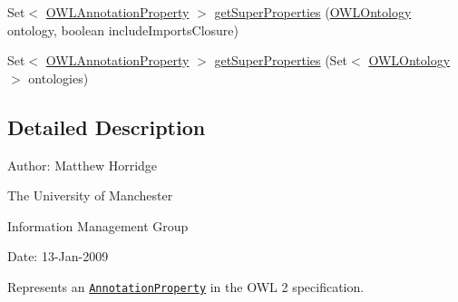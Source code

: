 \begin{DoxyCompactItemize}
\item 
Set$<$ \hyperlink{interfaceorg_1_1semanticweb_1_1owlapi_1_1model_1_1_o_w_l_annotation_property}{O\-W\-L\-Annotation\-Property} $>$ \hyperlink{interfaceorg_1_1semanticweb_1_1owlapi_1_1model_1_1_o_w_l_annotation_property_a8d84d70da5bd9e5cab3e8bb26069e190}{get\-Super\-Properties} (\hyperlink{interfaceorg_1_1semanticweb_1_1owlapi_1_1model_1_1_o_w_l_ontology}{O\-W\-L\-Ontology} ontology, boolean include\-Imports\-Closure)
\item 
Set$<$ \hyperlink{interfaceorg_1_1semanticweb_1_1owlapi_1_1model_1_1_o_w_l_annotation_property}{O\-W\-L\-Annotation\-Property} $>$ \hyperlink{interfaceorg_1_1semanticweb_1_1owlapi_1_1model_1_1_o_w_l_annotation_property_aaee41eac3141111316306ac3488bc05b}{get\-Super\-Properties} (Set$<$ \hyperlink{interfaceorg_1_1semanticweb_1_1owlapi_1_1model_1_1_o_w_l_ontology}{O\-W\-L\-Ontology} $>$ ontologies)
\end{DoxyCompactItemize}


\subsection{Detailed Description}
Author\-: Matthew Horridge\par
 The University of Manchester\par
 Information Management Group\par
 Date\-: 13-\/\-Jan-\/2009 

Represents an \href{http://www.w3.org/TR/2009/REC-owl2-syntax-20091027/#Annotation_Properties}{\tt Annotation\-Property} in the O\-W\-L 2 specification. 

